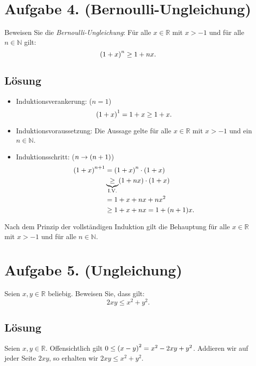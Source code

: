 \documentclass[german,12pt]{homework}
\newcommand{\NN}{\mathbb{N}}
\newcommand{\RR}{\mathbb{R}}
\DeclarePairedDelimiter{\enbrace}{(}{)}
\begin{document}
    \section*{Aufgabe 4. (Bernoulli-Ungleichung)}

    \begin{problem}
        Beweisen Sie die \emph{Bernoulli-Ungleichung}: Für alle \(x \in \RR\)
        mit \(x > -1\) und für alle \(n \in \NN\) gilt:
        \[\enbrace*{1 + x}^n \ge 1 + nx.\]
    \end{problem}

    \subsection*{Lösung}
    \begin{itemize}
        \item Induktionsverankerung: (\(n = 1\))
        \[\enbrace*{1 + x}^1 = 1 + x \ge 1 + x.\]
        \item Induktionsvoraussetzung: Die Aussage gelte für alle \(x \in \RR\)
        mit \(x > -1\) und ein \(n \in \NN\).
        \item Induktionsschritt: (\(n \to \enbrace*{n + 1}\))
        \begin{align*}
            \enbrace*{1 + x}^{n + 1} &= \enbrace*{1 + x}^n \cdot \enbrace*{1 +
            x}\\
            &\underbrace{\ge}_\text{I.V.} \enbrace*{1 + nx} \cdot \enbrace*{1 +
            x}\\
            &= 1 + x + nx + nx^2\\
            &\ge 1 + x + nx = 1 + \enbrace*{n + 1}x.
        \end{align*}
    \end{itemize}
    Nach dem Prinzip der vollständigen Induktion gilt die Behauptung für alle
    \(x \in \RR\) mit \(x > -1\) und für alle \(n \in \NN\).

    \section*{Aufgabe 5. (Ungleichung)}

    \begin{problem}
        Seien \(x, y \in \RR\) beliebig. Beweisen Sie, dass gilt:
        \[2xy \le x^2 + y^2.\]
    \end{problem}

    \subsection*{Lösung} Seien \(x, y \in \RR\). Offensichtlich gilt \(0 \le
    \enbrace*{x - y}^2 = x^2 - 2xy + y^2\). Addieren wir auf jeder Seite
    \(2xy\), so erhalten wir \(2xy \le x^2 + y^2\).
\end{document}
